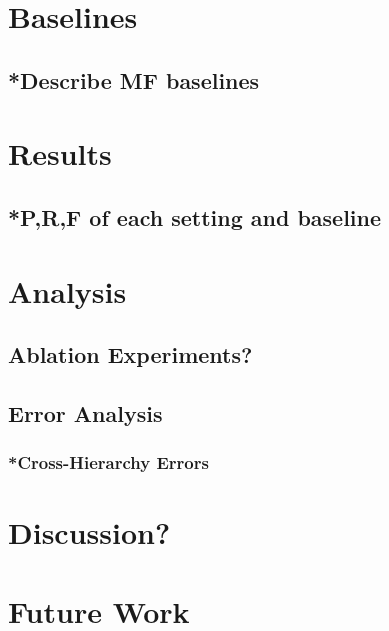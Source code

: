 \section{Baselines}
\subsection{*Describe MF baselines}

\section{Results}
\subsection{*P,R,F of each setting and baseline}

\section{Analysis}
\subsection{Ablation Experiments?}
\subsection{Error Analysis}
\subsubsection{*Cross-Hierarchy Errors}

\section{Discussion?}

\section{Future Work}

